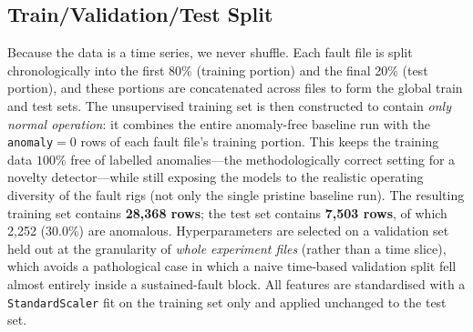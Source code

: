 \documentclass[conference]{IEEEtran}
\begin{document}
\subsection{Train/Validation/Test Split}
Because the data is a time series, we never shuffle. Each fault file is split
chronologically into the first 80\% (training portion) and the final 20\%
(test portion), and these portions are concatenated across files to form the
global train and test sets. The unsupervised training set is then constructed
to contain \emph{only normal operation}: it combines the entire anomaly-free
baseline run with the \texttt{anomaly}$=0$ rows of each fault file's training
portion. This keeps the training data $100\%$ free of labelled anomalies---the
methodologically correct setting for a novelty detector---while still exposing
the models to the realistic operating diversity of the fault rigs (not only the
single pristine baseline run). The resulting training set contains
\textbf{28{,}368 rows}; the test set contains \textbf{7{,}503 rows}, of which
2{,}252 ($30.0\%$) are anomalous. Hyperparameters are selected on a validation
set held out at the granularity of \emph{whole experiment files} (rather than a
time slice), which avoids a pathological case in which a naive time-based
validation split fell almost entirely inside a sustained-fault block. All
features are standardised with a \texttt{StandardScaler} fit on the training set
only and applied unchanged to the test set.
\end{document}
